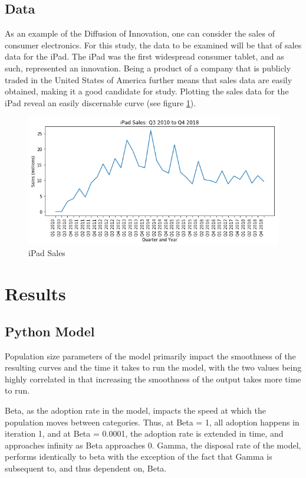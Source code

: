 \documentclass[11pt]{article}
\begin{document}
\subsection{Data}
As an example of the Diffusion of Innovation, one can consider the sales of consumer electronics. For this study, the data to be examined will be that of sales data for the iPad. The iPad was the first widespread consumer tablet, and as such, represented an innovation. Being a product of a company that is publicly traded in the United States of America further means that sales data are easily obtained, making it a good candidate for study. Plotting the sales data for the iPad reveal an easily discernable curve (see figure \ref{fig:iPad_adoption}).

\begin{figure}[h!]
	\centering
	\includegraphics[width=0.7\linewidth]{Diffusion_ipad.png}
	\caption{iPad Sales}
	\label{fig:iPad_adoption}
\end{figure}


\section{Results}

\subsection{Python Model}

Population size parameters of the model primarily impact the smoothness of the resulting curves and the time it takes to run the model, with the two values being highly correlated in that increasing the smoothness of the output takes more time to run.

Beta, as the adoption rate in the model, impacts the speed at which the population moves between categories. Thus, at Beta = 1, all adoption happens in iteration 1, and at Beta = 0.0001, the adoption rate is extended in time, and approaches infinity as Beta approaches 0. Gamma, the disposal rate of the model, performs identically to beta with the exception of the fact that Gamma is subsequent to, and thus dependent on, Beta.
\end{document}
